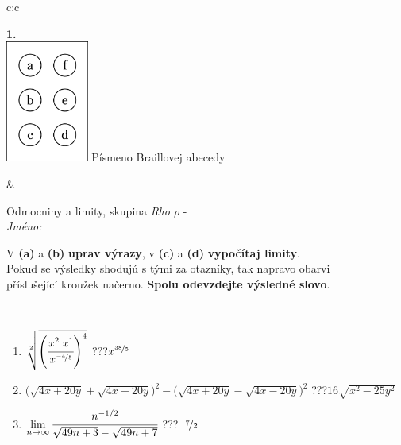 \documentclass[10pt]{report}
\begin{document}
\begin{tabular}{c:c}
\begin{minipage}[c][104.5mm][t]{0.5\linewidth}
\begin{center}
\begin{minipage}{0.20\linewidth}
\begin{center}
{\Huge\bfseries 1.} \\[2mm]
\includegraphics[height=40mm]{../images/braille.png}
{\small Písmeno Braillovej abecedy}
\end{center}
\end{minipage}
\end{center}
\end{minipage}
&
\begin{minipage}[c][104.5mm][t]{0.5\linewidth}
\begin{center}
\vspace{7mm}
{\huge Odmocniny a limity, skupina \textit{Rho $\rho$} -}\\[5mm]
\textit{Jméno:}\phantom{xxxxxxxxxxxxxxxxxxxxxxxxxxxxxxxxxxxxxxxxxxxxxxxxxxxxxxxxxxxxxxxxx}\\[5mm]
\begin{minipage}{0.95\linewidth}
\begin{center}
V \textbf{(a)} a \textbf{(b)} \textbf{uprav výrazy}, v \textbf{(c)} a \textbf{(d)} \textbf{vypočítaj limity}.\\Pokud se výsledky shodujú s tými za otazníky, tak napravo obarvi\\příslušející kroužek načerno. \textbf{Spolu odevzdejte výsledné slovo}.
\end{center}
\end{minipage}
\\[1mm]
\begin{minipage}{0.79\linewidth}
\begin{center}
\begin{varwidth}{\linewidth}
\begin{enumerate}
\small
\item $\sqrt[2]{\left(\cfrac{x^{2}\;x^{1}}{x^{\nicefrac{-4}{5}}}\right)^{4}}$\quad \dotfill\; ???\;\dotfill \quad $x^{\nicefrac{38}{5}}$
\item {\footnotesize{\scriptsize$\big(\sqrt{4x+20y}+\sqrt{4x-20y}\big)^2-\big(\sqrt{4x+20y}-\sqrt{4x-20y}\big)^2$}\quad \dotfill\; ???\;\dotfill \quad $16\sqrt{x^2-25y^2}$}
\item $\lim\limits_{n\to\infty}\cfrac{n^{-1/2}}{\sqrt{49n+3}-\sqrt{49n+7}}$\quad \dotfill\; ???\;\dotfill \quad $\nicefrac{-7}{2}$

\end{enumerate}
\end{varwidth}
\end{center}
\end{minipage}
\end{center}
\end{minipage}
\end{tabular}
\end{document}
